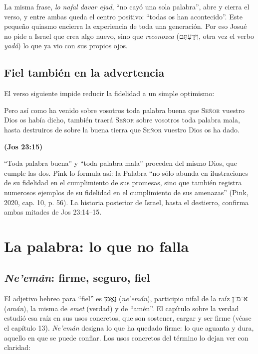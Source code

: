 \documentclass[11pt,letterpaper]{article}
\newcommand{\heb}[1]{\mbox{\foreignlanguage{hebrew}{#1}}}
\newcommand{\SENOR}{\textsc{Señor}}
\newcommand{\fuente}[1]{\par\hfill{\upshape\bfseries\small\textcolor{azul}{#1}}}
\begin{document}
La misma frase, \emph{lo nafal davar ejad}, ``no cayó una sola palabra'', abre y cierra el verso, y entre ambas queda el centro positivo: ``todas os han acontecido''. Este pequeño quiasmo encierra la experiencia de toda una generación. Por eso Josué no pide a Israel que crea algo nuevo, sino que \emph{reconozca} (\heb{וִידַעְתֶּם}, otra vez el verbo \emph{yadá}) lo que ya vio con sus propios ojos.

\subsection{Fiel también en la advertencia}
El verso siguiente impide reducir la fidelidad a un simple optimismo:

\begin{cita}Pero así como ha venido sobre vosotros toda palabra buena que \SENOR{} vuestro Dios os había dicho, también traerá \SENOR{} sobre vosotros toda palabra mala, hasta destruiros de sobre la buena tierra que \SENOR{} vuestro Dios os ha dado.\fuente{(Jos 23:15)}\end{cita}

``Toda palabra buena'' y ``toda palabra mala'' proceden del mismo Dios, que cumple las dos. Pink lo formula así: la Palabra ``no sólo abunda en ilustraciones de su fidelidad en el cumplimiento de sus promesas, sino que también registra numerosos ejemplos de su fidelidad en el cumplimiento de sus amenazas'' (Pink, 2020, cap. 10, p. 56). La historia posterior de Israel, hasta el destierro, confirma ambas mitades de Jos 23:14--15.

\section{La palabra: lo que no falla}

\subsection{\emph{Ne'emán}: firme, seguro, fiel}
El adjetivo hebreo para ``fiel'' es \heb{נֶאֱמָן} (\emph{ne'emán}), participio nifal de la raíz \heb{א־מ־ן} (\emph{amán}), la misma de \emph{emet} (verdad) y de ``amén''. El capítulo sobre la verdad estudió esa raíz en sus usos concretos, que son sostener, cargar y ser firme (véase el capítulo 13). \emph{Ne'emán} designa lo que ha quedado firme: lo que aguanta y dura, aquello en que se puede confiar. Los usos concretos del término lo dejan ver con claridad:
\end{document}
